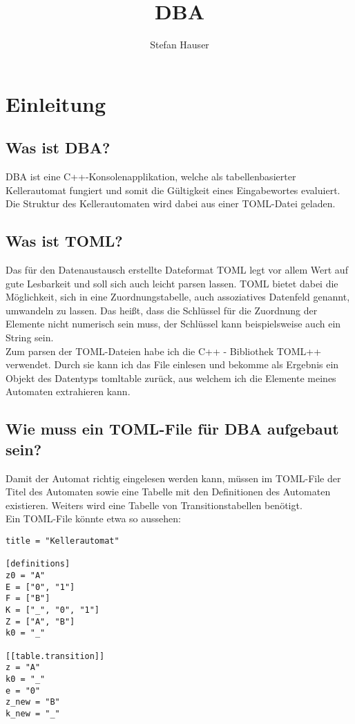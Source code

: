 \documentclass[12pt,a4paper]{article}
\begin{document}
\begin{titlepage}
\centering
\title{DBA}
\author{Stefan Hauser}
\vfill
\end{titlepage}
\maketitle
\newpage
\tableofcontents
\newpage

\section{Einleitung}
\subsection{Was ist DBA?}
DBA ist eine C++-Konsolenapplikation, welche als tabellenbasierter Kellerautomat fungiert und somit die Gültigkeit eines Eingabewortes evaluiert. Die Struktur des Kellerautomaten wird dabei aus einer TOML-Datei geladen.
\subsection{Was ist TOML?}
Das für den Datenaustausch erstellte Dateformat TOML legt vor allem Wert auf gute Lesbarkeit und soll sich auch leicht parsen lassen. TOML bietet dabei die Möglichkeit, sich in eine Zuordnungstabelle, auch assoziatives Datenfeld genannt, umwandeln zu lassen. Das heißt, dass die Schlüssel für die Zuordnung der Elemente nicht numerisch sein muss, der Schlüssel kann beispielsweise auch ein String sein.
\\
\medskip
Zum parsen der TOML-Dateien habe ich die C++ - Bibliothek TOML++ verwendet. Durch sie kann ich das File einlesen und bekomme als Ergebnis ein Objekt des Datentyps tomltable zurück, aus welchem ich die Elemente meines Automaten extrahieren kann.

\subsection{Wie muss ein TOML-File für DBA aufgebaut sein?}
Damit der Automat richtig eingelesen werden kann, müssen im TOML-File der Titel des Automaten sowie eine Tabelle mit den Definitionen des Automaten existieren. Weiters wird eine Tabelle von Transitionstabellen benötigt. 
\\
Ein TOML-File könnte etwa so aussehen:
\begin{lstlisting}
title = "Kellerautomat"

[definitions]
z0 = "A"             
E = ["0", "1"]       
F = ["B"]            
K = ["_", "0", "1"]  
Z = ["A", "B"]       
k0 = "_"             

[[table.transition]]
z = "A"
k0 = "_"
e = "0"
z_new = "B"
k_new = "_"
\end{lstlisting}
\end{document}
